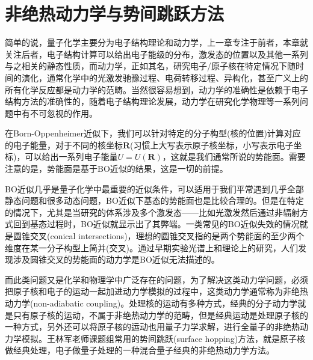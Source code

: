 \documentclass[12pt,a4paper,openany,twoside]{book}
\numberwithin{equation}{section}
\begin{document}
  \chapter{非绝热动力学与势间跳跃方法}
    简单的说，量子化学主要分为电子结构理论和动力学，上一章专注于前者，本章就关注后者，电子结构计算可以给出电子能级的分布，激发态的位置以及其他一系列与之相关的静态性质，而动力学，正如其名，研究电子/原子核在特定情况下随时间的演化，通常化学中的光激发驰豫过程、电荷转移过程、异构化，甚至广义上的所有化学反应都是动力学的范畴。当然很容易想到，动力学的准确性是依赖于电子结构方法的准确性的，随着电子结构理论发展，动力学在研究化学物理等一系列问题中有不可忽视的作用。

    在Born-Oppenheimer近似下，我们可以针对特定的分子构型(核的位置)计算对应的电子能量，对于不同的核坐标$\mathbf{R}$(习惯上大写表示原子核坐标，小写表示电子坐标)，可以给出一系列电子能量$U=U(\mathbf{R})$，这就是我们通常所说的势能面。需要注意的是，势能面是基于BO近似的结果，这是一切的前提。
    
    BO近似几乎是量子化学中最重要的近似条件，可以适用于我们平常遇到几乎全部静态问题和很多动态问题，BO近似下基态的势能面也是比较合理的。但是在特定的情况下，尤其是当研究的体系涉及多个激发态——比如光激发然后通过非辐射方式回到基态过程时，BO近似就显示出了其弊端。一类常见的BO近似失效的情况就是圆锥交叉(conical intersections)，理想的圆锥交叉指的是两个势能面的至少两个维度在某一分子构型上简并(交叉)。通过早期实验光谱上和理论上的研究，人们发现涉及圆锥交叉的势能面的动力学是BO近似无法描述的。
    
    而此类问题又是化学和物理学中广泛存在的问题，为了解决这类动力学问题，必须把原子核和电子的运动一起加进动力学模拟的过程中，这类动力学通常称为非绝热动力学(non-adiabatic coupling)。处理核的运动有多种方式，经典的分子动力学就是只有原子核的运动，不属于非绝热动力学的范畴，但是经典运动是处理原子核的一种方式，另外还可以将原子核的运动也用量子力学求解，进行全量子的非绝热动力学模拟。王林军老师课题组常用的势间跳跃(surface hopping)方法，就是原子核做经典处理，电子做量子处理的一种混合量子经典的非绝热动力学方法。
\end{document}
